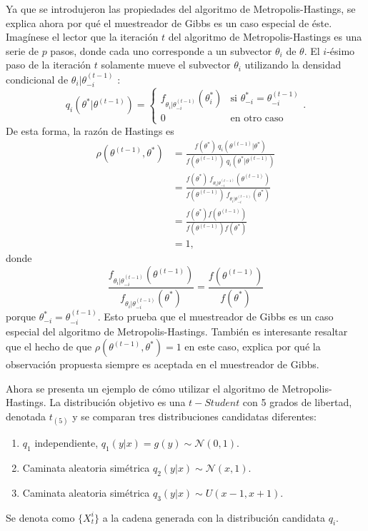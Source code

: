 \documentclass[11pt,a4paper]{article}
\begin{document}
Ya que se introdujeron las propiedades del algoritmo de Metropolis-Hastings, se explica ahora por qué el muestreador de Gibbs es un caso especial de éste. Imagínese el lector que la iteración $t$ del algoritmo de Metropolis-Hastings es una serie de $p$ pasos, donde cada uno corresponde a un subvector $\theta_i$ de $\theta$. El $i$-ésimo paso de la iteración $t$ solamente mueve el subvector $\theta_i$ utilizando la densidad condicional de $\theta_i | \theta^{(t-1)}_{-i}$ \citep{gelman}:
$$q_i(\theta^* | \theta^{(t-1)}) = \begin{cases}
f_{\theta_i | \theta_{-i}^{(t-1)}} (\theta^*_{i}) & \text{si } \theta^*_{-i} = \theta^{(t-1)}_{-i}\\
0 & \text{en otro caso} \end{cases}.$$ De esta forma, la razón de Hastings es
\begin{align*}
\rho(\theta^{(t-1)}, \theta^*) &= \frac{f(\theta^*) \ q_i(\theta^{(t-1)}|\theta^*)}{f(\theta^{(t-1)}) \ q_i(\theta^*|\theta^{(t-1)})}\\
&= \frac{f(\theta^*) \ f_{\theta_i|\theta_{-i}^{(t-1)}}(\theta^{(t-1)})}{f(\theta^{(t-1)}) \ f_{\theta_i|\theta_{-i}^{(t-1)}}(\theta^*)}\\
&= \frac{f(\theta^*)f(\theta^{(t-1)})}{f(\theta^{(t-1)})f(\theta^*)}\\
&= 1,
\end{align*}
donde $$\frac{f_{\theta_i|\theta_{-i}^{(t-1)}}(\theta^{(t-1)})}{f_{\theta_i|\theta_{-i}^{(t-1)}}(\theta^*)} = \frac{f(\theta^{(t-1)})}{f(\theta^*)}$$ porque $\theta_{-i}^* = \theta_{-i}^{(t-1)}$. Esto prueba que el muestreador de Gibbs es un caso especial del algoritmo de Metropolis-Hastings. También es interesante resaltar que el hecho de que  $\rho(\theta^{(t-1)}, \theta^*) = 1$ en este caso, explica por qué la observación propuesta siempre es aceptada en el muestreador de Gibbs.

Ahora se presenta un ejemplo de cómo utilizar el algoritmo de Metropolis-Hastings. La distribución objetivo es una $t-Student$ con 5 grados de libertad, denotada $t_{(5)}$ y se comparan tres distribuciones candidatas diferentes:
\begin{enumerate}
\item $q_1$ independiente, $q_1(y|x) = g(y) \sim \mathcal{N}(0, 1).$
\item Caminata aleatoria simétrica $q_2(y|x) \sim \mathcal{N}(x, 1).$
\item Caminata aleatoria simétrica $q_3(y|x) \sim U(x - 1, x + 1).$
\end{enumerate}
Se denota como $\lbrace X_t^i \rbrace$ a la cadena generada con la distribución candidata $q_i$.
\end{document}
